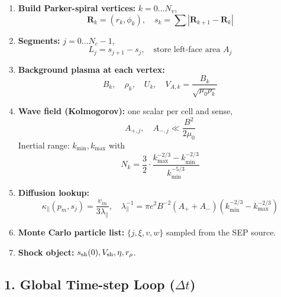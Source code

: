 \begin{enumerate}
    \item \textbf{Build Parker-spiral vertices:} $k = 0 \dots N_v$,
    \[
    \mathbf{R}_k = (r_k, \phi_k), \quad
    s_k = \sum | \mathbf{R}_{k+1} - \mathbf{R}_k |
    \]
    
    \item \textbf{Segments:} $j = 0 \dots N_c - 1$,
    \[
    L_j = s_{j+1} - s_j, \quad \text{store left-face area } A_j
    \]
    
    \item \textbf{Background plasma at each vertex:}
    \[
    B_k,\quad \rho_k,\quad U_k,\quad V_{A,k} = \frac{B_k}{\sqrt{\mu_0 \rho_k}}
    \]
    
    \item \textbf{Wave field (Kolmogorov):} one scalar per cell and sense,
    \[
    A_{+,j},\quad A_{-,j} \ll \frac{B^2}{2\mu_0}
    \]
    Inertial range: $k_{\min}, k_{\max}$ with
    \[
    N_k = \frac{3}{2} \cdot \frac{k_{\max}^{-2/3} - k_{\min}^{-2/3}}{k_{\min}^{-5/3}}
    \]
    
    \item \textbf{Diffusion lookup:}
    \[
    \kappa_\parallel(p_m, s_j) = \frac{v_m}{3 \lambda_\parallel}, \quad
    \lambda_\parallel^{-1} = \pi e^2 B^{-2} (A_+ + A_-) (k_{\min}^{-2/3} - k_{\max}^{-2/3})
    \]
    
    \item \textbf{Monte Carlo particle list:} $\{j, \xi, v, w\}$ sampled from the SEP source.
    
    \item \textbf{Shock object:} $s_{\rm sh}(0), V_{\rm sh}, \eta, r_\rho$.
\end{enumerate}

\subsection*{1. Global Time-step Loop ($\Delta t$)}

